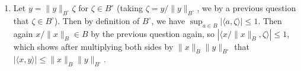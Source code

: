 \documentclass[12pt]{article}
\theoremstyle{definitionstyle}
\newcommand{\mg}[1]{\| #1 \|}
\renewcommand{\ip}[1]{\langle#1\rangle}
\newcommand{\1}{\mathds 1}
\begin{document}
\begin{enumerate}
        \item Let $y = \mg{y}_{B^\circ} \zeta$ for $\zeta \in B^\circ$ (taking $\zeta = y/\mg{y}_{B^\circ}$, we by a previous question that $\zeta \in B^\circ$). Then by definition of $B^\circ$, we have $\sup_{a \in B} |\ip{a, \zeta}| \leq 1$. Then again $x/\mg{x}_B \in B$ by the previous question again, so $|\ip{x/\mg{x}_B, \zeta}| \leq 1$, which shows after multiplying both sides by $\mg{x}_B \mg{y}_{B^\circ}$ that $|\ip{x,y}| \leq \mg{x}_B \mg{y}_{B^\circ}$.
    \end{enumerate}
\end{document}
